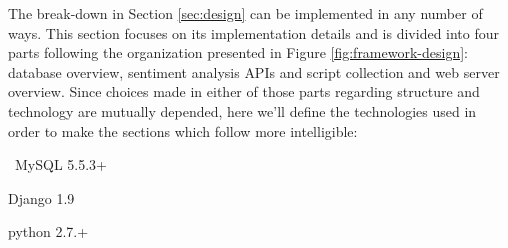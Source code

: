\newcommand*{\ImplementationPath}{04-framework/02-implementation}

The break-down in Section \ref{sec:design} can be implemented in any number of ways. 
This section focuses on its implementation details and is divided into four parts following the organization presented in Figure \ref{fig:framework-design}: database overview, sentiment analysis APIs and script collection and web server overview. 
Since choices made in either of those parts regarding structure and technology are mutually depended, here we'll define the technologies used in order to make the sections which follow more intelligible:
\begin{description}
\singlespacing
 \item[DBMS:] MySQL 5.5.3+
 \item[Web framework:] Django 1.9 
 \item[Sentiment analysis scripts:] python 2.7.+
\end{description}








\newpage
